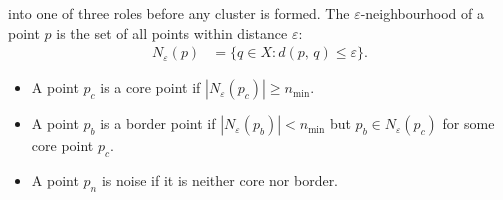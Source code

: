 \begin{marginfigure}[1em]
\centering
{}
\vspace{1em}
\caption{ The black point has $|N_\varepsilon|{=}5 \geq n_{\min}{=}4$. 
Four companions sit inside its dashed $\varepsilon$-neighbourhood. The small grey digit at the upper right gives $|N_\varepsilon|$, the point itself included.}
\label{fig:dbscan_core}
\end{marginfigure}



 into one of three roles before any cluster is formed.
The $\varepsilon$-neighbourhood of a point $p$ is the set of all points within distance $\varepsilon$:
\begin{align*}
    N_\varepsilon(p) &= \{q \in X : d(p,\,q) \leq \varepsilon\}.
\end{align*}

\begin{itemize}
    \item A point $p_c$ is a core point if $|N_\varepsilon(p_c)| \geq n_{\min}$.
    \item A point $p_b$ is a border point if $|N_\varepsilon(p_b)| < n_{\min}$ but $p_b \in N_\varepsilon(p_c)$ for some core point $p_c$.
    \item A point $p_n$ is noise if it is neither core nor border.
\end{itemize}

